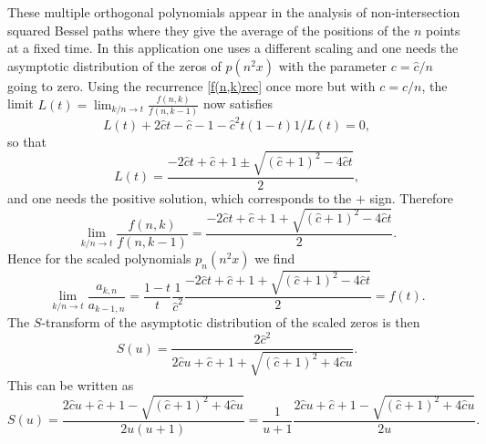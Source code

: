 \documentclass[12pt]{article}
\numberwithin{equation}{section}
\begin{document}
These multiple orthogonal polynomials appear in the analysis of non-intersection squared Bessel paths \cite{kuijlaars-MF-Wiel} where they
give the average of the positions of the $n$ points at a fixed time. In this application one uses a different scaling and one
needs the asymptotic distribution of the zeros of $p(n^2 x)$ with the parameter $c =\hat{c}/n$ going to zero. Using the recurrence
\eqref{f(n,k)rec} once more but with $c = \hat{c}/n$, the limit $L(t) = \lim_{k/n \to t} \frac{f(n,k)}{f(n,k-1)}$ now satisfies
\[   L(t) + 2\hat{c}t-\hat{c} -1 - \hat{c}^2 t(1-t) 1/L(t) = 0, \]
so that
\[  L(t) = \frac{-2\hat{c}t+\hat{c}+1 \pm \sqrt{(\hat{c}+1)^2-4\hat{c}t}}{2}, \]
and one needs the positive solution, which corresponds to the $+$ sign. Therefore
\[   \lim_{k/n \to t}  \frac{f(n,k)}{f(n,k-1)} =  \frac{-2\hat{c}t+\hat{c}+1 + \sqrt{(\hat{c}+1)^2-4\hat{c}t}}{2}.  \]
Hence for the scaled polynomials $p_n(n^2x)$ we find 
\[    \lim_{k/n\to t} \frac{a_{k,n}}{a_{k-1,n}} = \frac{1-t}{t} \frac{1}{\hat{c}^2}  \frac{-2\hat{c}t+\hat{c}+1 + \sqrt{(\hat{c}+1)^2-4\hat{c}t}}{2} = f(t).  \]
The $S$-transform of the asymptotic distribution of the scaled zeros is then
\[    S(u) = \frac{2\hat{c}^2}{2\hat{c} u + \hat{c}+1 + \sqrt{(\hat{c}+1)^2+4\hat{c}u}} . \]
This can be written as
\[  S(u) = \frac{2\hat{c} u + \hat{c}+1 - \sqrt{(\hat{c}+1)^2+4\hat{c}u}}{2 u(u+1)}   = \frac{1}{u+1} \frac{2\hat{c} u + \hat{c}+1 - \sqrt{(\hat{c}+1)^2+4\hat{c}u}}{2 u}.  \]
\end{document}
